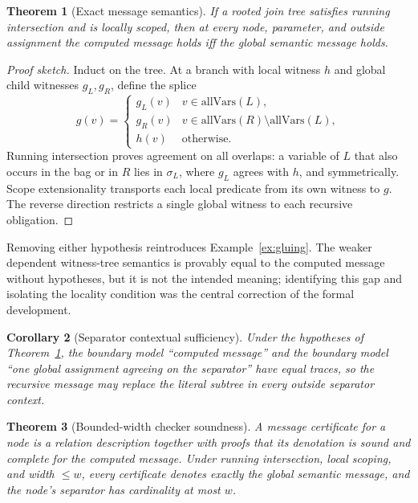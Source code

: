 \documentclass[11pt,a4paper]{article}
\theoremstyle{plain}
\newtheorem{theorem}{Theorem}[section]
\newtheorem{corollary}[theorem]{Corollary}
\theoremstyle{definition}
\theoremstyle{remark}
\begin{document}
\begin{theorem}[Exact message semantics]\label{thm:message}
If a rooted join tree satisfies running intersection and is locally scoped, then at every node, parameter, and outside assignment the computed message holds iff the global semantic message holds.
\end{theorem}
\begin{proof}[Proof sketch]
Induct on the tree. At a branch with local witness $h$ and global child witnesses $g_L,g_R$, define the splice
\[
g(v)=\begin{cases}g_L(v)&v\in\mathrm{allVars}(L),\\ g_R(v)&v\in\mathrm{allVars}(R)\setminus\mathrm{allVars}(L),\\ h(v)&\text{otherwise.}\end{cases}
\]
Running intersection proves agreement on all overlaps: a variable of $L$ that also occurs in the bag or in $R$ lies in $\sigma_L$, where $g_L$ agrees with $h$, and symmetrically. Scope extensionality transports each local predicate from its own witness to $g$. The reverse direction restricts a single global witness to each recursive obligation.
\end{proof}

Removing either hypothesis reintroduces Example~\ref{ex:gluing}. The weaker dependent witness-tree semantics is provably equal to the computed message without hypotheses, but it is not the intended meaning; identifying this gap and isolating the locality condition was the central correction of the formal development.

\begin{corollary}[Separator contextual sufficiency]\label{cor:sep}
Under the hypotheses of Theorem~\ref{thm:message}, the boundary model ``computed message'' and the boundary model ``one global assignment agreeing on the separator'' have equal traces, so the recursive message may replace the literal subtree in every outside separator context.
\end{corollary}

\begin{theorem}[Bounded-width checker soundness]\label{thm:checker}
A \emph{message certificate} for a node is a relation description together with proofs that its denotation is sound and complete for the computed message. Under running intersection, local scoping, and width $\le w$, every certificate denotes exactly the global semantic message, and the node's separator has cardinality at most $w$.
\end{theorem}
\end{document}
